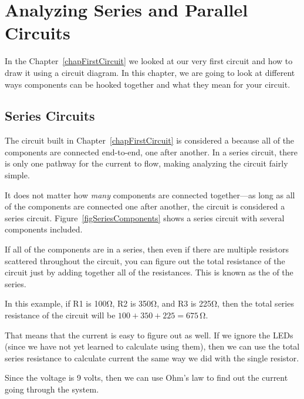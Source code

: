 \chapter{Analyzing Series and Parallel Circuits}
\label{chSeriesParallel}


In the Chapter~\ref{chapFirstCircuit} we looked at our very first circuit and how to draw it using a circuit diagram.
In this chapter, we are going to look at different ways components can be hooked together and what they mean for your circuit.

\section{Series Circuits}

The circuit built in Chapter~\ref{chapFirstCircuit} is considered a  because all of the components are connected end-to-end, one after another.
In a series circuit, there is only one pathway for the current to flow, making analyzing the circuit fairly simple.

It does not matter how \emph{many} components are connected together---as long as all of the components are connected one after another, the circuit is considered a series circuit.
Figure~\ref{figSeriesComponents} shows a series circuit with several components included.


If all of the components are in a series, then even if there are multiple resistors scattered throughout the circuit, you can figure out the total resistance of the circuit just by adding together all of the resistances.
This is known as the  of the series.

In this example, if R1 is 100\si{\ohm}, R2 is 350\si{\ohm}, and R3 is 225\si{\ohm}, then the total series resistance of the circuit will be $100 + 350 + 225 = 675\,\si{\ohm}$.

That means that the current is easy to figure out as well.
If we ignore the LEDs (since we have not yet learned to calculate using them), then we can use the total series resistance to calculate current the same way we did with the single resistor.

Since the voltage is 9 volts, then we can use Ohm's law to find out the current going through the system.

